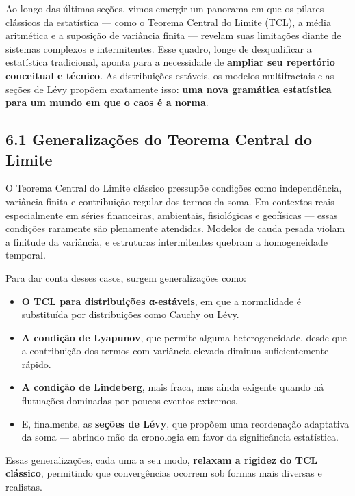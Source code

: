 \documentclass[
  portuguese,
]{agujournal2019}
\providecommand{\tightlist}{%
  \setlength{\itemsep}{0pt}\setlength{\parskip}{0pt}}
\begin{document}
Ao longo das últimas seções, vimos emergir um panorama em que os pilares
clássicos da estatística --- como o Teorema Central do Limite (TCL), a
média aritmética e a suposição de variância finita --- revelam suas
limitações diante de sistemas complexos e intermitentes. Esse quadro,
longe de desqualificar a estatística tradicional, aponta para a
necessidade de \textbf{ampliar seu repertório conceitual e técnico}. As
distribuições estáveis, os modelos multifractais e as seções de Lévy
propõem exatamente isso: \textbf{uma nova gramática estatística para um
mundo em que o caos é a norma}.

\subsection{6.1 Generalizações do Teorema Central do
Limite}\label{generalizauxe7uxf5es-do-teorema-central-do-limite}

O Teorema Central do Limite clássico pressupõe condições como
independência, variância finita e contribuição regular dos termos da
soma. Em contextos reais --- especialmente em séries financeiras,
ambientais, fisiológicas e geofísicas --- essas condições raramente são
plenamente atendidas. Modelos de cauda pesada violam a finitude da
variância, e estruturas intermitentes quebram a homogeneidade temporal.

Para dar conta desses casos, surgem generalizações como:

\begin{itemize}
\tightlist
\item
  \textbf{O TCL para distribuições α-estáveis}, em que a normalidade é
  substituída por distribuições como Cauchy ou Lévy.
\item
  \textbf{A condição de Lyapunov}, que permite alguma heterogeneidade,
  desde que a contribuição dos termos com variância elevada diminua
  suficientemente rápido.
\item
  \textbf{A condição de Lindeberg}, mais fraca, mas ainda exigente
  quando há flutuações dominadas por poucos eventos extremos.
\item
  E, finalmente, as \textbf{seções de Lévy}, que propõem uma reordenação
  adaptativa da soma --- abrindo mão da cronologia em favor da
  significância estatística.
\end{itemize}

Essas generalizações, cada uma a seu modo, \textbf{relaxam a rigidez do
TCL clássico}, permitindo que convergências ocorrem sob formas mais
diversas e realistas.
\end{document}

